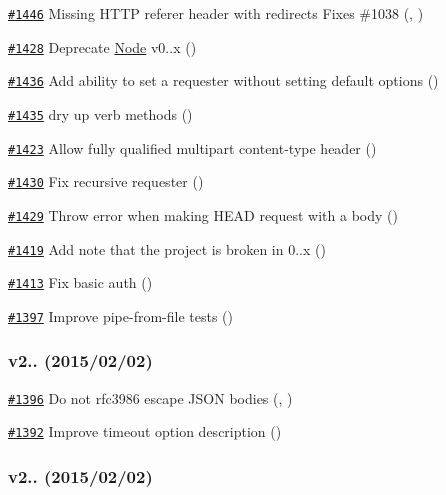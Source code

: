 \begin{DoxyItemize}
\item \href{https://github.com/request/request/pull/1446}{\tt \#1446} Missing H\+T\+TP referer header with redirects Fixes \#1038 (, )
\item \href{https://github.com/request/request/pull/1428}{\tt \#1428} Deprecate \mbox{\hyperlink{classNode}{Node}} v0..\+x ()
\item \href{https://github.com/request/request/pull/1436}{\tt \#1436} Add ability to set a requester without setting default options ()
\item \href{https://github.com/request/request/pull/1435}{\tt \#1435} dry up verb methods ()
\item \href{https://github.com/request/request/pull/1423}{\tt \#1423} Allow fully qualified multipart content-\/type header ()
\item \href{https://github.com/request/request/pull/1430}{\tt \#1430} Fix recursive requester ()
\item \href{https://github.com/request/request/pull/1429}{\tt \#1429} Throw error when making H\+E\+AD request with a body ()
\item \href{https://github.com/request/request/pull/1419}{\tt \#1419} Add note that the project is broken in 0..\+x ()
\item \href{https://github.com/request/request/pull/1413}{\tt \#1413} Fix basic auth ()
\item \href{https://github.com/request/request/pull/1397}{\tt \#1397} Improve pipe-\/from-\/file tests ()
\end{DoxyItemize}

\subsubsection*{v2.. (2015/02/02)}


\begin{DoxyItemize}
\item \href{https://github.com/request/request/pull/1396}{\tt \#1396} Do not rfc3986 escape J\+S\+ON bodies (, )
\item \href{https://github.com/request/request/pull/1392}{\tt \#1392} Improve {\ttfamily timeout} option description ()
\end{DoxyItemize}

\subsubsection*{v2.. (2015/02/02)}


